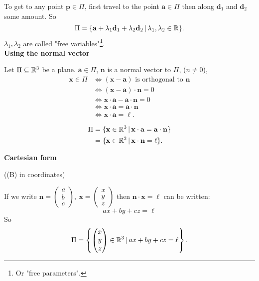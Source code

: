 \documentclass[10pt, a4paper]{article}
\newcommand{\mbf}[1]{\mathbf{#1}}
\begin{document}
To get to any point $\mbf{p} \in \Pi$, first travel to the point $\mbf{a} \in \Pi$ then along $\mbf{d}_1$ and $\mbf{d}_2$ some amount. So
\[
\Pi = \{\mbf{a} + \lambda_1\mbf{d}_1 + \lambda_2\mbf{d}_2\,|\,\lambda_1, \lambda_2 \in \R\}.
\]
$\lambda_1, \lambda_2$ are called "free variables"\footnote{Or "free parameters".}. \\

\textbf{Using the normal vector}

Let $\Pi \subseteq \mathbb{R} ^ 3$ be a plane. $\mbf{a} \in \Pi$, $\mbf{n}$ is a normal vector to $\Pi$, ($n \neq 0$), 
\begin{align*}
    \mbf{x} \in \Pi &\iff (\mbf{x - a}) \text{ is orthogonal to } \mbf{n} \\
    &\iff (\mbf{x - a}) \cdot \mbf{n} = 0 \\
    &\iff \mbf{x \cdot a} - \mbf{a \cdot n} = 0 \\ 
    &\iff \mbf{x \cdot a} = \mbf{a \cdot n} \\ 
    &\iff \mbf{x \cdot a} = \ell.
\end{align*}

\begin{align*}
    \Pi &= \{\mbf{x} \in \R ^ 3\,|\,\mbf{x\cdot a} = \mbf{a \cdot n}\} \\
    &= \{\mbf{x} \in \R ^ 3\,|\, \mbf{x \cdot n} = \ell\}.
\end{align*}

\textbf{Cartesian form}

((B) in coordinates)

If we write $\mbf{n} = \begin{pmatrix}
    a \\ b \\ c
\end{pmatrix},\ \mbf{x} = \begin{pmatrix}
    x \\ y \\ z
\end{pmatrix}$ then $\mbf{n \cdot x} = \ell$ can be written:
\[
ax + by + cz = \ell
\]
So
\[
\Pi = \left\{\begin{pmatrix}
    x \\ y \\ z
\end{pmatrix} \in \mathbb{R} ^ 3\,|\, ax + by + cz = \ell\right\}.
\]
\end{document}
